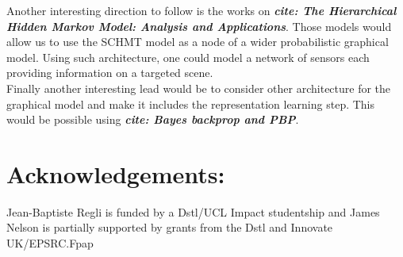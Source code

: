 \documentclass[a4paper,11pt]{report}
\begin{document}
		Another interesting direction to follow is the works on  \textbf{\textit{cite: The Hierarchical Hidden Markov Model: Analysis and Applications}}. Those models would allow us to use the SCHMT model as a node of a wider probabilistic graphical model. Using such architecture, one could model a network of sensors each providing information on a targeted scene.\\
		
		Finally another interesting lead would be to consider other architecture for the graphical model and make it includes the representation learning step. This would be possible using  
     \textbf{\textit{cite: Bayes backprop and PBP}}.
    
\chapter{Acknowledgements:}
	Jean-Baptiste Regli is funded by a Dstl/UCL Impact studentship and James Nelson is partially supported by grants from the Dstl and Innovate UK/EPSRC.Fpap

	
\begin{thebibliography}{99}
  
\end{thebibliography}

\end{document}
